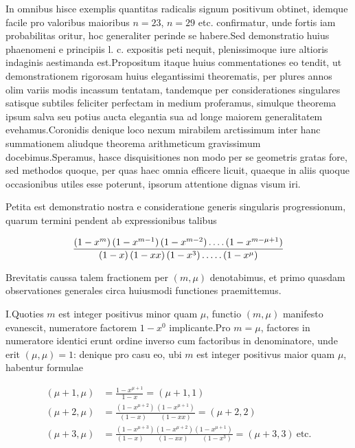 %

In omnibus hisce exemplis quantitas radicalis signum positivum obtinet, idemque facile pro valoribus maioribus $n=23$, $n=29$ etc. confirmatur, unde fortis iam probabilitas oritur, hoc generaliter perinde se habere.\quad Sed demonstratio huius phaenomeni e principiis l. c. expositis peti nequit, plenissimoque iure altioris indaginis aestimanda est.\quad Propositum itaque huius commentationes eo tendit, ut demonstrationem rigorosam huius elegantissimi theorematis, per plures annos olim variis modis incassum tentatam, tandemque per considerationes singulares satisque subtiles feliciter perfectam in medium proferamus, simulque theorema ipsum salva seu potius aucta elegantia sua ad longe maiorem generalitatem evehamus.\quad Coronidis denique loco nexum mirabilem arctissimum inter hanc summationem aliudque theorema arithmeticum gravissimum docebimus.\quad Speramus, hasce disquisitiones non modo per se geometris gratas fore, sed methodos quoque, per quas haec omnia efficere licuit, quaeque in aliis quoque occasionibus utiles esse poterunt, ipsorum attentione dignas visum iri.


Petita est demonstratio nostra e consideratione generis singularis progressionum, quarum termini pendent ab expressionibus talibus

\[
\begin{aligned}
\frac{(1-x^m)\,(1-x^{m-1})\,(1-x^{m-2})\mathinner{.\,.\,.\,.}(1-x^{m-\mu+1})}{(1-x)\,(1-xx)\,(1-x^3)\mathinner{.\,.\,.\,.\,.}(1-x^\mu)}
\end{aligned}
\]

Brevitatis caussa talem fractionem per $(m,\mu)$ denotabimus, et primo quasdam observationes generales circa huiusmodi functiones praemittemus.

I.\quad Quoties $m$ est integer positivus minor quam $\mu$, functio $(m,\mu)$ manifesto evanescit, numeratore factorem $1-x^0$ implicante.\quad Pro $m=\mu$, factores in numeratore identici erunt ordine inverso cum factoribus in denominatore, unde erit $(\mu,\mu)=1$: denique pro casu eo, ubi $m$ est integer positivus maior quam $\mu$, habentur formulae

\[
\begin{aligned}
(\mu+1,\mu)&=\frac{1-x^{\mu+1}}{1-x}=(\mu+1,1)\\
(\mu+2,\mu)&=\frac{(1-x^{\mu+2})\,(1-x^{\mu+1})}{(1-x)\qquad(1-xx)}=(\mu+2,2)\\
(\mu+3,\mu)&=\frac{(1-x^{\mu+3})(1-x^{\mu+2})(1-x^{\mu+1})}{(1-x)\qquad(1-xx)\qquad(1-x^3)}=(\mu+3,3)\ \text{etc.}
\end{aligned}
\]

